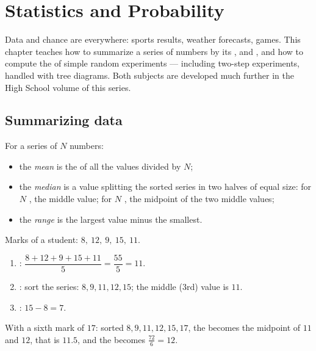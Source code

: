 \chapter{Statistics and Probability}\label{ch:g9:statproba}

Data and chance are everywhere: sports results, weather forecasts,
games. This chapter teaches how to summarize a series of numbers by its
,  and , and how to compute the  of simple
random experiments --- including two-step experiments, handled with tree
diagrams. Both subjects are developed much further in the High School
volume of this series.

\section{Summarizing data}

\begin{definition}\label{def:g9:statproba:indicators}
For a series of $N$ numbers:
\begin{itemize}
  \item the \emph{mean} is the  of all the values divided
        by $N$;
  \item the \emph{median} is a value splitting the sorted
        series in two halves of equal size: for $N$ , the middle
        value; for $N$ , the midpoint of the two middle values;
  \item the \emph{range} is the largest value minus the
        smallest.
\end{itemize}
\end{definition}

\begin{example}\label{ex:g9:statproba:indicators}
Marks of a student: $8,\ 12,\ 9,\ 15,\ 11$.
\begin{enumerate}
  \item {}: $\dfrac{8 + 12 + 9 + 15 + 11}{5} = \dfrac{55}{5} = 11$.
  \item {}: sort the series: $8, 9, 11, 12, 15$; the middle (3rd)
        value is $11$.
  \item {}: $15 - 8 = 7$.
\end{enumerate}
With a sixth mark of $17$: sorted $8, 9, 11, 12, 15, 17$, the 
becomes the midpoint of $11$ and $12$, that is $11.5$, and the 
becomes $\frac{72}{6} = 12$.
\end{example}

